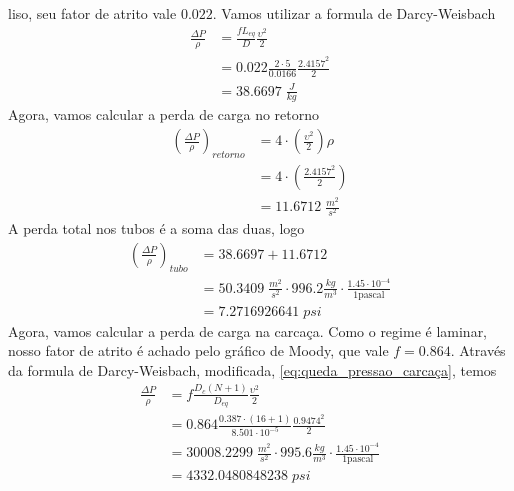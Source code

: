 liso, seu fator de atrito vale \(0.022\). Vamos utilizar a formula de Darcy-Weisbach
\begin{align}
    \frac{\Delta P}{\rho } &= \frac{fL_{eq} }{D} \frac{\upsilon ^{2}}{2}\\
    &= 0.022 \frac{2 \cdot 5}{0.0166} \frac{2.4157^{2}}{2}\\
    &= 38.6697 \; \frac{J}{kg}
\end{align}
Agora, vamos calcular a perda de carga no retorno
\begin{align}
    \left(\frac{\Delta P}{\rho }\right)_{retorno} &= 4 \cdot \left( \frac{\upsilon ^{2}}{2}  \right) \rho \\
    &= 4 \cdot \left( \frac{2.4157^{2}}{2}  \right)\\
    &= 11.6712 \; \frac{m^{2} }{s ^{2} }
\end{align}
A perda total nos tubos é a soma das duas, logo
\begin{align}
    \left(\frac{\Delta P}{\rho }\right)_{tubo} &= 38.6697 + 11.6712\\
    &= 50.3409 \; \frac{m^{2} }{s ^{2} } \cdot 996.2 \frac{kg}{m  ^{3}} \cdot \frac{1.45 \cdot 10^{-4}}{1 \text{pascal}}\\
    &= 7.2716926641 \; psi
\end{align}
Agora, vamos calcular a perda de carga na carcaça. Como o regime é laminar, nosso fator de atrito é
achado pelo gráfico de Moody, que vale \(f = 0.864\). Através da formula de Darcy-Weisbach,
modificada, \eqref{eq:queda_pressao_carcaça}, temos
\begin{align}
    \frac{\Delta P}{\rho } &= f \frac{D_{c} \left( N+1 \right) }{D_{eq} }\frac{\upsilon ^{2} }{2}\\
    &= 0.864 \frac{0.387 \cdot \left( 16 + 1 \right) }{8.501 \cdot 10^{-5}} \frac{0.9474^{2}}{2}\\
    &= 30008.2299 \; \frac{m^{2} }{s ^{2} } \cdot 995.6 \frac{kg}{m  ^{3}} \cdot \frac{1.45 \cdot 10^{-4}}{1 \text{pascal}}\\
    &= 4332.0480848238 \; psi
\end{align}
